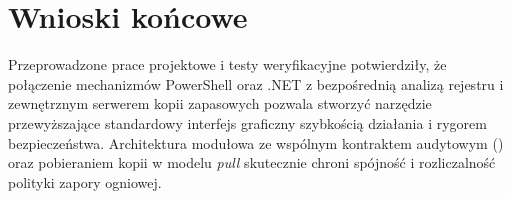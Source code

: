 \section{Wnioski końcowe}\label{sec:wnioski}

Przeprowadzone prace projektowe i testy weryfikacyjne potwierdziły, że połączenie mechanizmów PowerShell oraz .NET z bezpośrednią analizą rejestru i zewnętrznym serwerem kopii zapasowych pozwala stworzyć narzędzie przewyższające standardowy interfejs graficzny szybkością działania i rygorem bezpieczeństwa. Architektura modułowa ze wspólnym kontraktem audytowym () oraz pobieraniem kopii w modelu \textit{pull} skutecznie chroni spójność i rozliczalność polityki zapory ogniowej.
